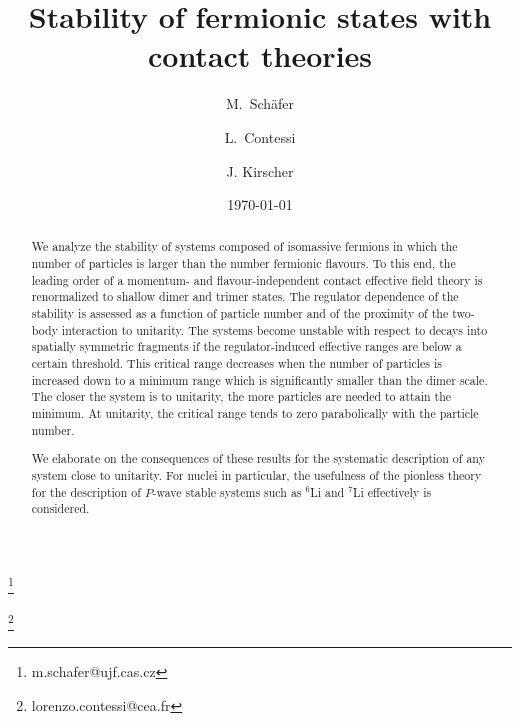 \documentclass[aps,prl,onecolumn,groupedaddress,superscriptaddress]
{revtex4}
\begin{document}
\title{Stability of fermionic states with contact theories}
\author{M.~Sch{\"a}fer}\thanks{m.schafer@ujf.cas.cz}
\author{L.~Contessi}\thanks{lorenzo.contessi@cea.fr}
\author{J. Kirscher}
\date{\today}

\begin{abstract}
We analyze the stability of systems composed of isomassive fermions in which
the number of particles is larger than the number fermionic flavours. 
To this end, the leading order of a momentum- and flavour-independent
contact effective field theory is renormalized to shallow dimer and
trimer states.
The regulator dependence of the stability is assessed as a function
of particle number and of the proximity of the two-body interaction
to unitarity.
The systems become unstable
with respect to decays into spatially symmetric fragments
if the regulator-induced effective ranges
are below a certain threshold.
This critical range decreases when
the number of particles is increased 
down to a minimum range which is significantly
smaller than the dimer scale.
The closer the system is to unitarity, the
more particles are needed to attain the minimum. At unitarity, the
critical range tends to zero parabolically with the particle number.

We elaborate on the consequences of these results for the systematic
description of any system close to unitarity. For nuclei in particular,
the usefulness of the pionless theory
for the description of $P$-wave stable systems such as $^6$Li and $^7$Li effectively
is considered.
\end{abstract}

\maketitle

\vspace{4mm}
\end{document}
